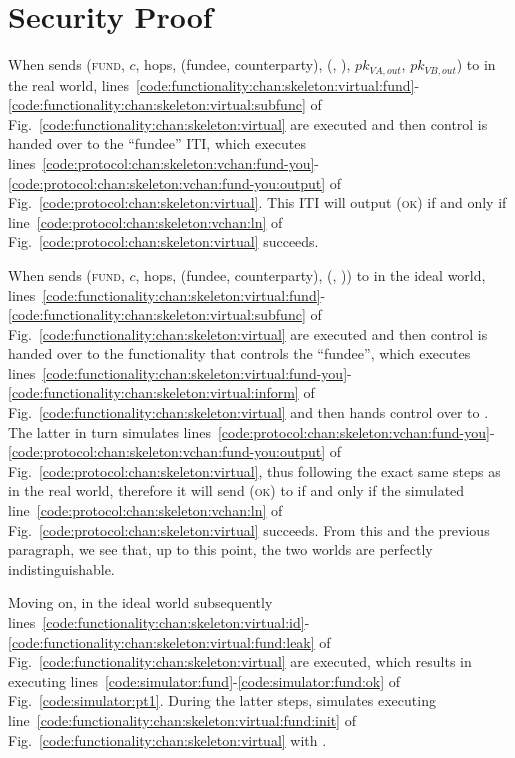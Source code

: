 \section{Security Proof}
  When \environment sends (\textsc{fund}, $c$, hops, (fundee, counterparty),
  (\charlie, \dave), $pk_{\mathit{VA}, out}$, $pk_{\mathit{VB}, out}$) to \alice
  in the real world,
  lines~\ref{code:functionality:chan:skeleton:virtual:fund}-\ref{code:functionality:chan:skeleton:virtual:subfunc}
  of Fig.~\ref{code:functionality:chan:skeleton:virtual} are executed and then
  control is handed over to the ``fundee'' ITI, which executes
  lines~\ref{code:protocol:chan:skeleton:vchan:fund-you}-\ref{code:protocol:chan:skeleton:vchan:fund-you:output}
  of Fig.~\ref{code:protocol:chan:skeleton:virtual}.  This ITI will output
  (\textsc{ok}) if and only if line~\ref{code:protocol:chan:skeleton:vchan:ln}
  of Fig.~\ref{code:protocol:chan:skeleton:virtual} succeeds.

  When \environment sends (\textsc{fund}, $c$, hops, (fundee, counterparty),
  (\charlie, \dave)) to \alice in the ideal world,
  lines~\ref{code:functionality:chan:skeleton:virtual:fund}-\ref{code:functionality:chan:skeleton:virtual:subfunc}
  of Fig.~\ref{code:functionality:chan:skeleton:virtual} are executed and then
  control is handed over to the functionality that controls the ``fundee'',
  which executes
  lines~\ref{code:functionality:chan:skeleton:virtual:fund-you}-\ref{code:functionality:chan:skeleton:virtual:inform}
  of Fig.~\ref{code:functionality:chan:skeleton:virtual} and then hands control
  over to \simulator. The latter in turn simulates
  lines~\ref{code:protocol:chan:skeleton:vchan:fund-you}-\ref{code:protocol:chan:skeleton:vchan:fund-you:output}
  of Fig.~\ref{code:protocol:chan:skeleton:virtual}, thus following the exact
  same steps as in the real world, therefore it will send (\textsc{ok}) to
  \fchan if and only if the simulated
  line~\ref{code:protocol:chan:skeleton:vchan:ln} of
  Fig.~\ref{code:protocol:chan:skeleton:virtual} succeeds. From this and the
  previous paragraph, we see that, up to this point, the two worlds are
  perfectly indistinguishable.

  Moving on, in the ideal world subsequently
  lines~\ref{code:functionality:chan:skeleton:virtual:id}-\ref{code:functionality:chan:skeleton:virtual:fund:leak}
  of Fig.~\ref{code:functionality:chan:skeleton:virtual} are executed, which
  results in \simulator executing
  lines~\ref{code:simulator:fund}-\ref{code:simulator:fund:ok} of
  Fig.~\ref{code:simulator:pt1}. During the latter steps, \simulator simulates
  executing line~\ref{code:functionality:chan:skeleton:virtual:fund:init} of
  Fig.~\ref{code:functionality:chan:skeleton:virtual} with \alice.

